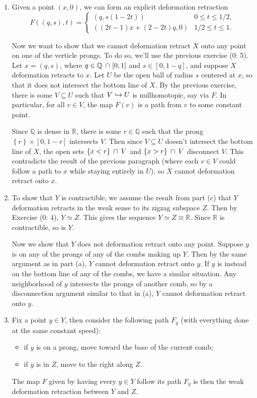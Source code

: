 \documentclass[twoside,10pt]{article}
\begin{document}
\begin{enumerate}
	\item Given a point $(x,0)$, we can form an explicit deformation retraction
		\[
			F( (q,s), t) =
			\begin{cases}
				(q, s(1-2t)) & 0 \leq t \leq 1/2, \\
				( (2t-1)x + (2-2t)q, 0) & 1/2 \leq t \leq 1.
			\end{cases}
		\] 

		Now we want to show that we cannot deformation retract $X$ onto any point on one of the verticle prongs. To do so, we'll use the previous exercise (0: 5). Let $x = (q,s)$, where $q \in \mathbb{Q} \operatorname{\;\cap\;} [0,1]$ and $s \in [0,1-q]$, and suppose $X$ deformation retracts to $x$. Let $U$ be the open ball of radius $s$ centered at $x$, so that it does not intersect the bottom line of $X$. By the previous exercise, there is some $V \subseteq U$ such that $V \hookrightarrow U$ is nullhomotopic, say via $F$. In particular, for all $v \in V$, the map $F(v)$ is a path from $v$ to some constant point.

		Since $\mathbb{Q}$ is dense in $\mathbb{R}$, there is some $r \in \mathbb{Q}$ such that the prong $\left\{ r \right\}\times [0,1-r]$ intersects $V$. Then since $V \subseteq U$ doesn't intersect the bottom line of $X$, the open sets $\left\{ x < r \right\}\operatorname{\;\cap\;} V$ and $\left\{ x > r \right\} \operatorname{\;\cap\;} V$ disconnect $V$. This contradicts the result of the previous paragraph (where each $v\in V$ could follow a path to $x$ while staying entirely in $U$), so $X$ cannot deformation retract onto $x$.

	\item To show that $Y$ is contractible, we assume the result from part (c) that $Y$ deformation retracts in the weak sense to its zigzag subspace $Z$. Then by Exercise (0: 4), $Y \simeq Z$. This gives the sequence $Y \simeq Z \cong \mathbb{R}$. Since $\mathbb{R}$ is contractible, so is $Y$.

		Now we show that $Y$ does not deformation retract onto any point. Suppose $y$ is on any of the prongs of any of the combs making up $Y$. Then by the same argument as in part (a), $Y$ cannot deformation retract onto $y$. If $y$ is instead on the bottom line of any of the combs, we have a similar situation. Any neighborhood of $y$ intersects the prongs of another comb, so by a disconnection argument similar to that in (a), $Y$ cannot deformation retract onto $y$.

	\item Fix a point $y \in Y$, then consider the following path $F_{y}$ (with everything done at the same constant speed):
		\begin{itemize}
			\item if $y$ is on a prong, move toward the base of the current comb;
			\item if $y$ is in $Z$, move to the right along $Z$.
		\end{itemize}
		The map $F$ given by having every $y \in Y$ follow its path $F_{y}$ is then the weak deformation retraction between $Y$ and $Z$.


\end{enumerate}
\end{document}
